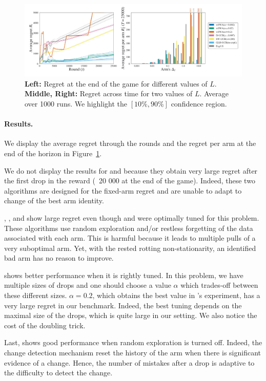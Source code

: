 \begin{figure}[t]
\centering
\includegraphics[width = 0.99 \textwidth]{3Rested/fig/fig2_SWA.pdf}
\caption{\textbf{Left:} Regret at the end of the game for different values of $L$. \textbf{Middle, Right:} Regret across time for two values of $L$. Average over 1000 runs. We highlight the $\left[10\%, 90\%\right]$ confidence region.}
\label{fig:SWA2}
\end{figure}

\paragraph{Results.} We display the average regret through the rounds and the regret per arm at the end of the horizon in Figure~\ref{fig:SWA2}.

We do not display the results for \UCB and \EXP because they obtain very large regret after the first drop in the reward (~20 000 at the end of the game). Indeed, these two algorithms are designed for the fixed-arm regret and are unable to adapt to change of the best arm identity. 
 
\SWUCB, \DUCB, and \EXPS show large regret even though \SWUCB and \DUCB were optimally tuned for this problem. These algorithms use random exploration and/or restless forgetting of the data associated with each arm. This is harmful because it leads to multiple pulls of a very suboptimal arm. Yet, with the rested rotting non-stationarity, an identified bad arm has no reason to improve.
 
\SWA shows better performance when it is rightly tuned. In this problem, we have multiple sizes of drops and one should choose a value $\alpha$ which trades-off between these different sizes.  $\alpha=0.2$, which obtains the best value in \citet{levine2017rotting}'s experiment, has a very large regret in our benchmark. Indeed, the best tuning depends on the maximal size of the drops, which is quite large in our setting. We also notice the cost of the doubling trick.

Last, \GLRUCB shows good performance when random exploration is turned off. Indeed, the change detection mechanism reset the history of the arm when there is significant evidence of a change. Hence, the number of mistakes after a drop is adaptive to the difficulty to detect the change. 

